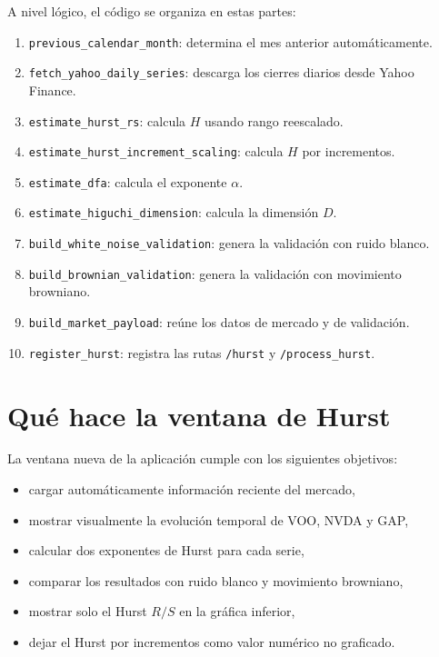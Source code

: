 \documentclass[12pt,a4paper]{article}
\begin{document}
A nivel lógico, el código se organiza en estas partes:

\begin{enumerate}
    \item \texttt{previous\_calendar\_month}: determina el mes anterior automáticamente.
    \item \texttt{fetch\_yahoo\_daily\_series}: descarga los cierres diarios desde Yahoo Finance.
    \item \texttt{estimate\_hurst\_rs}: calcula \(H\) usando rango reescalado.
    \item \texttt{estimate\_hurst\_increment\_scaling}: calcula \(H\) por incrementos.
    \item \texttt{estimate\_dfa}: calcula el exponente \(\alpha\).
    \item \texttt{estimate\_higuchi\_dimension}: calcula la dimensión \(D\).
    \item \texttt{build\_white\_noise\_validation}: genera la validación con ruido blanco.
    \item \texttt{build\_brownian\_validation}: genera la validación con movimiento browniano.
    \item \texttt{build\_market\_payload}: reúne los datos de mercado y de validación.
    \item \texttt{register\_hurst}: registra las rutas \texttt{/hurst} y \texttt{/process\_hurst}.
\end{enumerate}

\section{Qué hace la ventana de Hurst}

La ventana nueva de la aplicación cumple con los siguientes objetivos:

\begin{itemize}
    \item cargar automáticamente información reciente del mercado,
    \item mostrar visualmente la evolución temporal de VOO, NVDA y GAP,
    \item calcular dos exponentes de Hurst para cada serie,
    \item comparar los resultados con ruido blanco y movimiento browniano,
    \item mostrar solo el Hurst \(R/S\) en la gráfica inferior,
    \item dejar el Hurst por incrementos como valor numérico no graficado.
\end{itemize}
\end{document}
